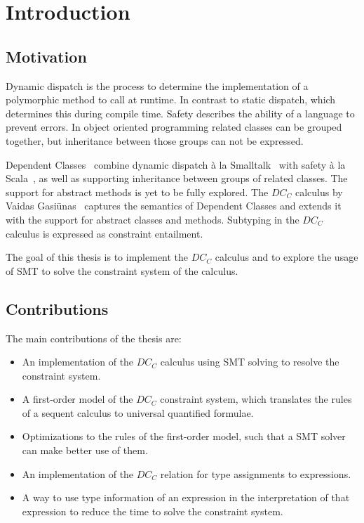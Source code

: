 \chapter{Introduction}
\section{Motivation}
Dynamic dispatch is the process to determine
the implementation of a polymorphic method
to call at runtime.
In contrast to static dispatch,
which determines this during compile time.
%
Safety describes the ability of a language
to prevent errors.
%
In object oriented programming
related classes can be grouped together,
but inheritance between those groups can not be expressed.

Dependent Classes~\cite{dc} combine dynamic dispatch à la Smalltalk~\cite{smalltalk}
with safety à la Scala~\cite{scala},
as well as supporting inheritance between groups of related classes.
The support for abstract methods is yet to be fully explored.
The $DC_C$ calculus by Vaidas Gasiūnas~\cite{vaidas:thesis}
captures the semantics of Dependent Classes
and extends it with the support for abstract classes and methods.
Subtyping in the $DC_C$ calculus is expressed as constraint entailment.

The goal of this thesis is to implement the $DC_C$ calculus
and to explore the usage of SMT to solve the constraint system of the calculus.


\section{Contributions}
The main contributions of the thesis are:
\begin{itemize}
  \item An implementation of the $DC_C$ calculus
        using SMT solving to resolve the constraint system.
  \item A first-order model of the $DC_C$ constraint system,
        which translates the rules of a sequent calculus
        to universal quantified formulae.
  \item Optimizations to the rules of the first-order model,
        such that a SMT solver can make better use of them.
  \item An implementation of the $DC_C$ relation for
        type assignments to expressions.
  \item A way to use type information of an expression
        in the interpretation of that expression
        to reduce the time to solve the constraint system.
\end{itemize}

